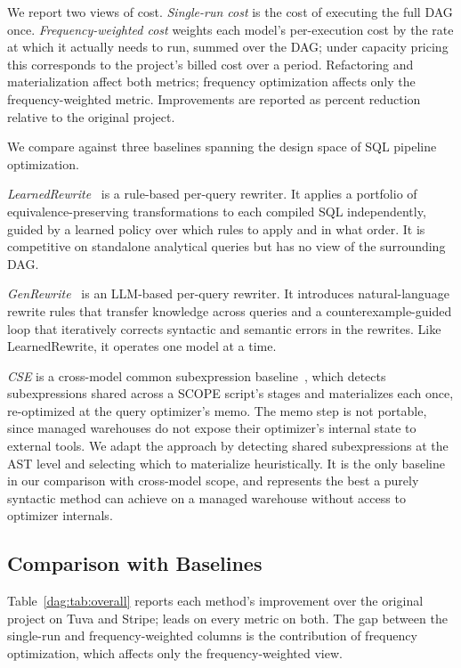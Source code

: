 We report two views of cost. \emph{Single-run cost} is the cost of executing the full DAG once. \emph{Frequency-weighted cost} weights each model's per-execution cost by the rate at which it actually needs to run, summed over the DAG; under capacity pricing this corresponds to the project's billed cost over a period. Refactoring and materialization affect both metrics; frequency optimization affects only the frequency-weighted metric. Improvements are reported as percent reduction relative to the original project.

We compare against three baselines spanning the design space of SQL pipeline optimization.

\emph{LearnedRewrite}~\cite{LR} is a rule-based per-query rewriter. It applies a portfolio of equivalence-preserving transformations to each compiled SQL independently, guided by a learned policy over which rules to apply and in what order. It is competitive on standalone analytical queries but has no view of the surrounding DAG.

\emph{GenRewrite}~\cite{genrewrite} is an LLM-based per-query rewriter. It introduces natural-language rewrite rules that transfer knowledge across queries and a counterexample-guided loop that iteratively corrects syntactic and semantic errors in the rewrites. Like LearnedRewrite, it operates one model at a time.

\emph{CSE} is a cross-model common subexpression baseline~\cite{scopeCSE}, which detects subexpressions shared across a SCOPE script's stages and materializes each once, re-optimized at the query optimizer's memo. The memo step is not portable, since managed warehouses do not expose their optimizer's internal state to external tools. We adapt the approach by detecting shared subexpressions at the AST level and selecting which to materialize heuristically. It is the only baseline
in our comparison with cross-model scope, and represents the best a purely
syntactic method can achieve on a managed warehouse without access to
optimizer internals.









\subsection{Comparison with Baselines}
\label{dag:sec:eval-baselines}

Table~\ref{dag:tab:overall} reports each method's improvement over the original project on Tuva and Stripe; \dagsmith{} leads on every metric on both. The gap between the single-run and frequency-weighted columns is the contribution of frequency optimization, which affects only the frequency-weighted view.

